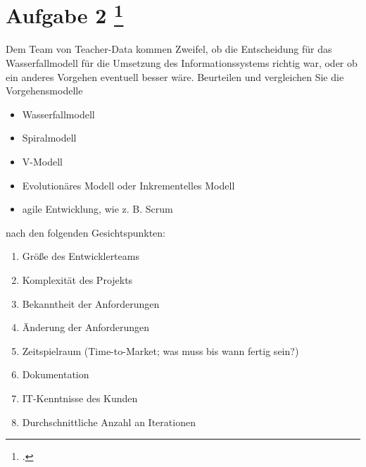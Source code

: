 \documentclass{lehramt-informatik-haupt}
\begin{document}
%

\section{Aufgabe 2
\footcite[Seite 2]{sosy:ab:1}}

Dem Team von Teacher-Data kommen Zweifel, ob die Entscheidung für das
Wasserfallmodell für die Umsetzung des Informationssystems richtig war,
oder ob ein anderes Vorgehen eventuell besser wäre. Beurteilen und
vergleichen Sie die Vorgehensmodelle

\begin{itemize}
\item Wasserfallmodell
\item Spiralmodell
\item V-Modell
\item Evolutionäres Modell oder Inkrementelles Modell
\item agile Entwicklung, wie z. B. Scrum
\end{itemize}

\noindent
nach den folgenden Gesichtspunkten:

\begin{enumerate}
\item Größe des Entwicklerteams
\item Komplexität des Projekts
\item Bekanntheit der Anforderungen
\item Änderung der Anforderungen
\item Zeitspielraum (Time-to-Market; was muss bis wann fertig sein?)
\item Dokumentation
\item IT-Kenntnisse des Kunden
\item Durchschnittliche Anzahl an Iterationen
\end{enumerate}
\end{document}
